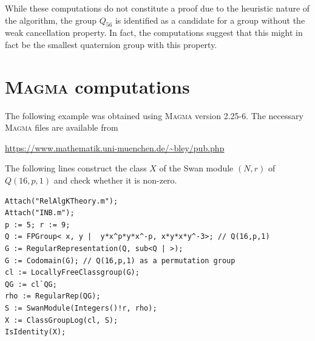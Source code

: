 \documentclass[11pt,leqno,a4paper]{amsart}
\theoremstyle{definition}
\theoremstyle{remark}
\theoremstyle{custom}
\begin{document}
While these computations do not constitute a proof due to the heuristic nature of the algorithm, the group $Q_{56}$ is identified as a candidate for a group without the weak cancellation property. In fact, the computations suggest that this might in fact be the smallest quaternion group with this property.

\section{\textsc{Magma} computations}\label{appendix:magma}

The following example was obtained using \textsc{Magma} version 2.25-6.
The necessary \textsc{Magma} files are available from
\begin{center}
    \url{https://www.mathematik.uni-muenchen.de/~bley/pub.php}
\end{center}
The following lines construct the class $X$ of the Swan module $(N, r)$ of $Q(16,p,1)$ and check whether it is non-zero.

\begin{verbatim}
Attach("RelAlgKTheory.m");
Attach("INB.m");
p := 5; r := 9;
Q := FPGroup< x, y |  y*x^p*y*x^-p, x*y*x*y^-3>; // Q(16,p,1)
G := RegularRepresentation(Q, sub<Q | >);
G := Codomain(G); // Q(16,p,1) as a permutation group
cl := LocallyFreeClassgroup(G);
QG := cl`QG;
rho := RegularRep(QG);
S := SwanModule(Integers()!r, rho);
X := ClassGroupLog(cl, S);
IsIdentity(X);
\end{verbatim}



\end{document}
